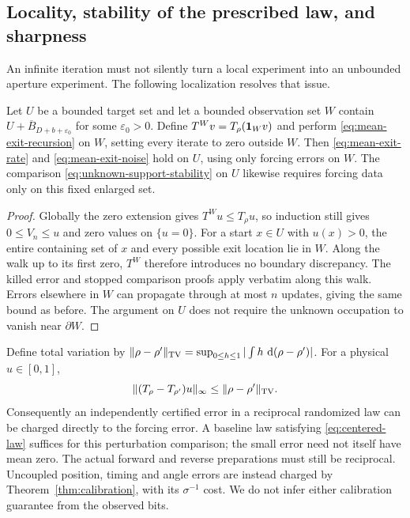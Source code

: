 \subsection{Locality, stability of the prescribed law, and sharpness}
An infinite iteration must not silently turn a local experiment into
an unbounded aperture experiment. The following localization resolves
that issue.

\begin{proposition}
\label{prop:fixed-exit-aperture}
Let $U$ be a bounded target set and let a bounded observation set $W$
contain $U+\overline B_{D+b+\varepsilon_0}$ for some
$\varepsilon_0>0$. Define $T^Wv=T_\rho(\mathbf 1_Wv)$ and perform
\eqref{eq:mean-exit-recursion} on $W$, setting every iterate to zero
outside $W$. Then \eqref{eq:mean-exit-rate} and
\eqref{eq:mean-exit-noise} hold on $U$, using only forcing errors on
$W$. The comparison \eqref{eq:unknown-support-stability} on $U$ likewise
requires forcing data only on this fixed enlarged set.
\end{proposition}
\begin{proof}
Globally the zero extension gives $T^Wu\le T_\rho u$, so induction
still gives $0\le V_n\le u$ and zero values on $\{u=0\}$.
For a start $x\in U$ with $u(x)>0$, the entire containing set of $x$
and every possible exit location lie in $W$. Along the walk up to
its first zero, $T^W$ therefore introduces no boundary discrepancy.
The killed error and stopped comparison proofs apply verbatim along
this walk. Errors elsewhere in $W$ can propagate through at most $n$
updates, giving the same bound as before. The argument on $U$ does
not require the unknown occupation to vanish near $\partial W$.
\end{proof}

Define total variation by
$\|\rho-\rho'\|_{\rm TV}=\sup_{0\le h\le1}|\int h\,\,\mathrm d(\rho-\rho')|$.
For a physical $u\in[0,1]$,
\begin{equation}\label{eq:operator-calibration}
 \|(T_\rho-T_{\rho'})u\|_\infty
                    \le\|\rho-\rho'\|_{\rm TV}.
\end{equation}
Consequently an independently certified error in a reciprocal randomized
law can be charged directly to the forcing error. A baseline law
satisfying \eqref{eq:centered-law} suffices for this perturbation
comparison; the small error need not itself have mean zero. The actual
forward and reverse preparations must still be reciprocal. Uncoupled
position, timing and angle errors are instead charged by
Theorem~\ref{thm:calibration}, with its $\sigma^{-1}$ cost.
We do not infer either calibration guarantee from the observed bits.

